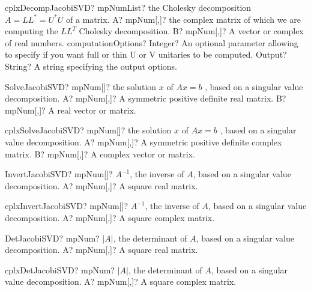 \documentclass[12pt,a4paper,openany]{book}
\begin{document}
\begin{mpFunctionsExtract}
\mpFunctionFour
{cplxDecompJacobiSVD? mpNumList? the Cholesky decomposition $A = LL^* = U^*U$ of a matrix.}
{A? mpNum[,]? the complex matrix of which we are computing the $LL^T$ Cholesky decomposition.}
{B? mpNum[,]? A vector or complex of real numbers.}
{computationOptions? Integer? An optional parameter allowing to specify if you want full or thin U or V unitaries to be computed.}
{Output? String? A string specifying the output options.}
\end{mpFunctionsExtract}

\begin{mpFunctionsExtract}
\mpFunctionTwo
{SolveJacobiSVD? mpNum[]? the solution $x$ of $A x = b$ , based on a singular value decomposition.}
{A? mpNum[,]? A symmetric positive definite real matrix.}
{B? mpNum[,]? A real vector or matrix.}
\end{mpFunctionsExtract}

\begin{mpFunctionsExtract}
\mpFunctionTwo
{cplxSolveJacobiSVD? mpNum[]? the solution $x$ of $A x = b$ , based on a singular value decomposition.}
{A? mpNum[,]? A symmetric positive definite complex matrix.}
{B? mpNum[,]? A complex vector or matrix.}
\end{mpFunctionsExtract}

\begin{mpFunctionsExtract}
\mpFunctionOne
{InvertJacobiSVD? mpNum[]? $A^{-1}$, the inverse of $A$, based on a singular value decomposition.}
{A? mpNum[,]? A square real matrix.}
\end{mpFunctionsExtract}

\begin{mpFunctionsExtract}
\mpFunctionOne
{cplxInvertJacobiSVD? mpNum[]? $A^{-1}$, the inverse of $A$, based on a singular value decomposition.}
{A? mpNum[,]? A square complex matrix.}
\end{mpFunctionsExtract}

\begin{mpFunctionsExtract}
\mpFunctionOne
{DetJacobiSVD? mpNum? $|A|$, the determinant of $A$, based on a singular value decomposition.}
{A? mpNum[,]? A square real matrix.}
\end{mpFunctionsExtract}

\begin{mpFunctionsExtract}
\mpFunctionOne
{cplxDetJacobiSVD? mpNum? $|A|$, the determinant of $A$, based on a singular value decomposition.}
{A? mpNum[,]? A square complex matrix.}
\end{mpFunctionsExtract}
\end{document}
